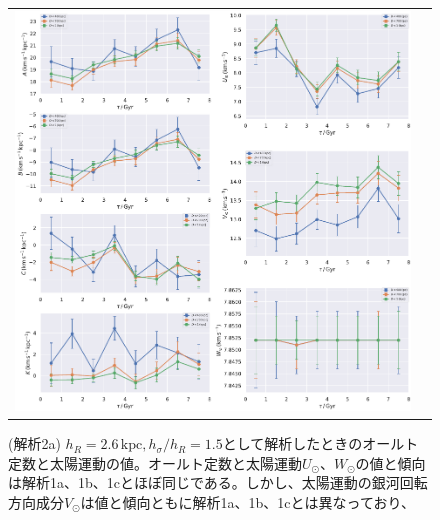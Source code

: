 \begin{figure}
   \centering
\begin{tabular}{cc}
\includegraphics[width=16cm]{fig/2a.pdf}
\end{tabular}
    \caption{(解析2a) $h_R=2.6\,\mathrm{kpc}, h_{\sigma}/h_R=1.5$として解析したときのオールト定数と太陽運動の値。オールト定数と太陽運動$U_{\odot}、W_{\odot}$の値と傾向は解析1a、1b、1cとほぼ同じである。しかし、太陽運動の銀河回転方向成分$V_{\odot}$は値と傾向ともに解析1a、1b、1cとは異なっており、}
    \label{figObs2a}
\end{figure}

